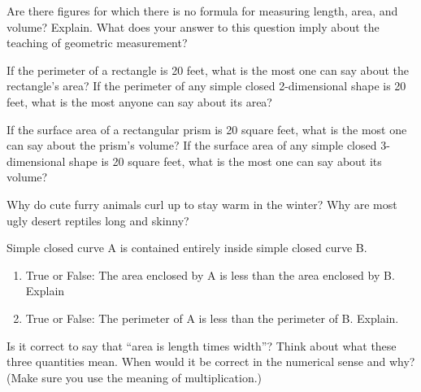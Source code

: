 \begin{prob}
Are there figures for which there is no formula for measuring length, area, and volume?  Explain.  What does your answer to this question imply about the teaching of geometric measurement?
\end{prob}

\begin{prob}
If the perimeter of a rectangle is 20 feet, what is the most one can say about the rectangle's area?  If the perimeter of any simple closed 2-dimensional shape is 20 feet, what is the most anyone can say about its area?
\end{prob}

\begin{prob}
If the surface area of a rectangular prism is 20 square feet, what is the most one can say about the prism's volume?  If the surface area of any simple closed 3-dimensional shape is 20 square feet, what is the most one can say about its volume? 
\end{prob}

\begin{prob}
Why do cute furry animals curl up to stay warm in the winter?  Why are most ugly desert reptiles long and skinny?
\end{prob}

\begin{prob}Simple closed curve A is contained entirely inside simple closed curve B.  
\begin{enumerate}
\item True or False:  The area enclosed by A is less than the area enclosed by B. Explain
\item True or False:  The perimeter of A is less than the perimeter of B. Explain.  
\end{enumerate}
\end{prob}

\begin{prob}
Is it correct to say that ``area is length times width''?  Think about what these three quantities mean.  When would it be correct in the numerical sense and why?  (Make sure you use the meaning of multiplication.)   
\end{prob}



